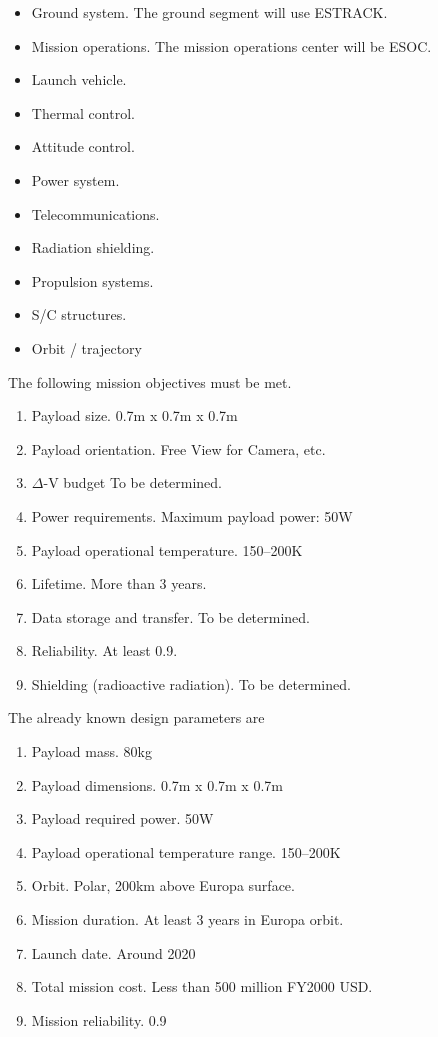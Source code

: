 \begin{itemize}
\item{Ground system.} The ground segment will use ESTRACK.
\item{Mission operations.} The mission operations center will be ESOC.
\item{Launch vehicle.}
\item{Thermal control.}
\item{Attitude control.}
\item{Power system.}
\item{Telecommunications.}
\item{Radiation shielding.}
\item{Propulsion systems.}
\item{S/C structures.}
\item{Orbit / trajectory}
\end{itemize}




The following mission objectives must be met.

\begin{enumerate}
\item{Payload size.} 0.7m x 0.7m x 0.7m
\item{Payload orientation.} Free View for Camera, etc.
\item{$\Delta$-V budget} To be determined.
\item{Power requirements.} Maximum payload power: 50W
\item{Payload operational temperature.} 150--200K
\item{Lifetime.} More than 3 years.
\item{Data storage and transfer.} To be determined.
\item{Reliability.} At least 0.9.
\item{Shielding (radioactive radiation).} To be determined.
\end{enumerate}


The already known design parameters are

\begin{enumerate}
\item{Payload mass.} 80kg
\item{Payload dimensions.} 0.7m x 0.7m x 0.7m
\item{Payload required power.} 50W
\item{Payload operational temperature range.} 150--200K
\item{Orbit.} Polar, 200km above Europa surface.
\item{Mission duration.} At least 3 years in Europa orbit.
\item{Launch date.} Around 2020
\item{Total mission cost.} Less than 500 million FY2000 USD.
\item{Mission reliability.} 0.9
\end{enumerate}

